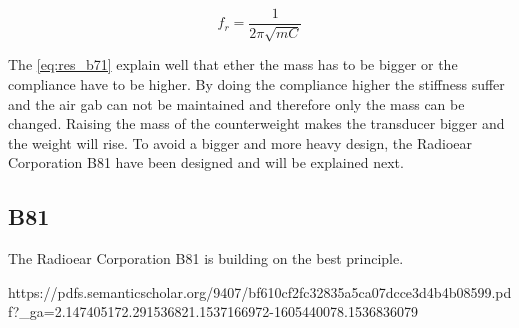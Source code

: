 \begin{equation}\label{eq:res_b71}
f_r=\frac{1}{2 \pi \sqrt{m C}}
\end{equation}

    \startexplain
    \stopexplain

The \autoref{eq:res_b71} explain well that ether the mass has to be bigger or the compliance have to be higher. By doing the compliance higher the stiffness suffer and the air gab can not be maintained and therefore only the mass can be changed. Raising the mass of the counterweight makes the transducer bigger and the weight will rise. To avoid a bigger and more heavy design, the Radioear Corporation B81 have been designed and will be explained next. 


\subsection{B81}
The Radioear Corporation B81 is building on the \gls{best} principle.

https://pdfs.semanticscholar.org/9407/bf610cf2fc32835a5ca07dcce3d4b4b08599.pdf?_ga=2.147405172.291536821.1537166972-1605440078.1536836079